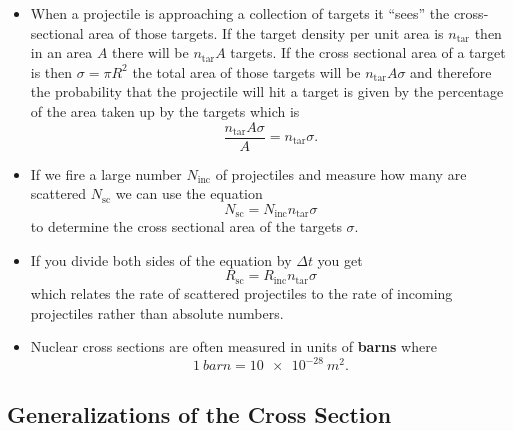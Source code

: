\documentclass{article}
\begin{document}
\begin{itemize}
  \item When a projectile is approaching a collection of targets it ``sees'' the cross-sectional area of those targets. If the target density per unit area is $n_\text{tar}$ then in an area $A$ there will be $n_\text{tar} A$ targets. If the cross sectional area of a target is then $\sigma = \pi R^2$ the total area of those targets will be $n_\text{tar} A \sigma$ and therefore the probability that the projectile will hit a target is given by the percentage of the area taken up by the targets which is \[\frac{n_\text{tar} A \sigma}{A} = n_\text{tar} \sigma.\]

  \item If we fire a large number $N_\text{inc}$ of projectiles and measure how many are scattered $N_\text{sc}$ we can use the equation \[N_\text{sc} = N_\text{inc} n_\text{tar} \sigma\] to determine the cross sectional area of the targets $\sigma$.

  \item If you divide both sides of the equation by $\Delta t$ you get \[R_\text{sc} = R_\text{inc} n_\text{tar} \sigma\] which relates the rate of scattered projectiles to the rate of incoming projectiles rather than absolute numbers.

  \item Nuclear cross sections are often measured in units of \textbf{barns} where \[\qty{1}{barn} = \qty{10e-28}{m^2}.\]
\end{itemize}

\subsection{Generalizations of the Cross Section}
\end{document}
